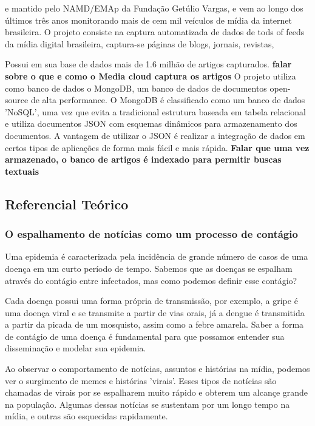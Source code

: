 \documentclass[a4paper,12pt]{article}
\begin{document}
 e mantido pelo NAMD/EMAp da Fundação Getúlio Vargas, e vem ao longo dos últimos três anos 
 monitorando mais de cem mil veículos de mídia da internet brasileira. 
 O projeto consiste na captura automatizada de dados de tods of feeds da mídia digital brasileira, captura-se páginas de blogs, jornais, revistas,
 
 Possui em
sua base de dados mais de 1.6 milhão de artigos capturados.
\textbf{falar sobre o que e como o Media cloud captura os artigos}
O projeto utiliza como banco de dados o MongoDB, um banco de dados de documentos open-source de alta performance. O MongoDB é classificado como um banco de 
dados 'NoSQL', uma vez que evita a tradicional estrutura  baseada em tabela relacional e utiliza documentos JSON com esquemas dinâmicos para armazenamento 
dos documentos. A vantagem de utilizar o JSON é realizar a integração de dados em certos tipos de aplicações de forma mais fácil e mais rápida.
\textbf{Falar que uma vez armazenado, o banco de artigos é indexado para permitir buscas textuais}

\subsection{Referencial Teórico}


\subsubsection{O espalhamento de notícias como um processo de contágio}

Uma epidemia é caracterizada pela incidência de grande número de casos de uma doença em um curto período de tempo. Sabemos que as doenças
se espalham através do contágio entre infectados, mas como podemos definir esse contágio? 

Cada doença possui uma forma própria de transmissão, por exemplo, a gripe é uma doença viral e se transmite a partir de vias orais, já a dengue
é transmitida a partir da picada de um mosquisto, assim como a febre amarela. Saber a forma de contágio de uma doença é fundamental para que
possamos entender sua disseminação e modelar sua epidemia.

Ao observar o comportamento de notícias, assuntos e histórias na mídia, podemos ver o surgimento de memes e histórias 'virais'. Esses 
tipos de notícias são chamadas de virais por se espalharem muito rápido e obterem um alcançe grande na população. Algumas dessas notícias
se sustentam por um longo tempo na mídia, e outras são esquecidas rapidamente. 
\end{document}

